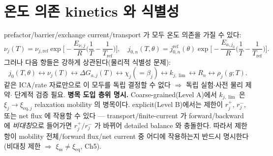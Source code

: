 \documentclass[11pt,a4paper]{article}
\newcommand{\eq}{\mathrm{eq}}
\newcommand{\sstat}{\mathrm{ss}}
\begin{document}
\section{온도 의존 kinetics 와 식별성}\label{sec:ch3_ident}
prefactor/barrier/exchange current/transport 가 모두 온도 의존을 가질 수 있다:
\begin{equation}
\nu_j(T)=\nu_{j,\mathrm{ref}}\exp\!\Big[-\frac{E_{\nu,j}}{R}\Big(\frac1T-\frac1{T_{\mathrm{ref}}}\Big)\Big],\quad
j_{0,n}(T,\theta)=j_{0,n}^{\mathrm{ref}}(\theta)\exp\!\Big[-\frac{E_{a,j_0}}{R}\Big(\frac1T-\frac1{T_{\mathrm{ref}}}\Big)\Big].
\label{eq:ch3_T}
\end{equation}
그러나 다음 항들은 강하게 상관된다(물리적 식별성 문제):
\begin{equation}
j_0(T,\theta)\leftrightarrow\nu_j(T)\leftrightarrow\Delta G_{a,j}(T)\leftrightarrow\chi_j(=\beta_j)\leftrightarrow k_{j,\lim}\leftrightarrow R_n\leftrightarrow\rho_j(g;T).
\label{eq:ch3_ident_chain}
\end{equation}
같은 ICA/rate 자료만으로 이 모두를 독립 결정할 수 없다 $\Rightarrow$ 독립 실험$\cdot$사전 물리 제약$\cdot$
단계적 검증 필요. \textbf{병목 도입 층위 명시.} Coarse-grained(Level A)에서 $k_{j,\lim}$ 은
$\xi_j\to\xi_{\eq,j}$ relaxation mobility 의 병목이다. explicit(Level B)에서는 제한이 $r_j^+$, $r_j^-$,
또는 net flux 에 작용할 수 있다 — transport/finite-current 가 forward/backward 에 \emph{비대칭}으로 들어가면
$r_j^+/r_j^-$ 가 바뀌어 detailed balance 와 충돌한다. 따라서 제한항이 mobility 전체/forward flux/net current
중 어디에 작용하는지 반드시 명시한다(비대칭 제한 $\Rightarrow$ $\xi_{\sstat}\ne\xi_{\eq}$, Ch5).

\end{document}
